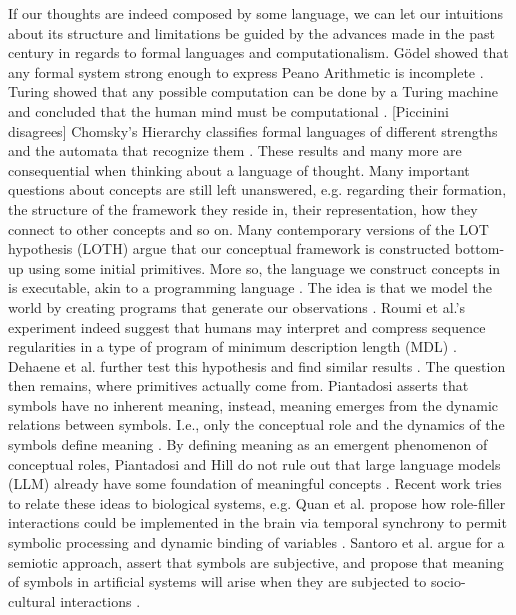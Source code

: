If our thoughts are indeed composed by some language, we can let our intuitions about its structure and limitations be guided by the advances made in the past century in regards to formal languages and computationalism.
Gödel showed that any formal system strong enough to express Peano Arithmetic is incomplete \cite{sep-goedel-incompleteness}. Turing showed that any possible computation can be done by a Turing machine and concluded that the human mind must be computational \cite{JCopeland2004-JCOTET}. [Piccinini disagrees]
Chomsky's Hierarchy classifies formal languages of different strengths and the automata that recognize them \cite{chomsky1959certain}.
These results and many more are consequential when thinking about a language of thought.
Many important questions about concepts are still left unanswered, e.g. regarding their formation, the structure of the framework they reside in, their representation, how they connect to other concepts and so on. 
Many contemporary versions of the LOT hypothesis (LOTH) argue that our conceptual framework is constructed bottom-up using some initial primitives. More so, the language we construct concepts in is executable, akin to a programming language \cite{dehaene_symbols_2022}. The idea is that we model the world by creating programs that generate our observations \cite{rule_child_2020}. 
Roumi et al.'s experiment indeed suggest that humans may interpret and compress sequence regularities in a type of program of minimum description length (MDL) \cite{al_roumi_mental_2021}.
Dehaene et al. further test this hypothesis and find similar results \cite{dehaene_symbols_2022}.
The question then remains, where primitives actually come from.
Piantadosi asserts that symbols have no inherent meaning, instead, meaning emerges from the dynamic relations between symbols. I.e., only the conceptual role and the dynamics of the symbols define meaning \cite{piantadosi2021computational}.
By defining meaning as an emergent phenomenon of conceptual roles, Piantadosi and Hill do not rule out that large language models (LLM) already have some foundation of meaningful concepts \cite{piantasodi2022meaning}.
Recent work tries to relate these ideas to biological systems, e.g. Quan et al. propose how role-filler interactions could be implemented in the brain via temporal synchrony to permit symbolic processing and dynamic binding of variables \cite{do2021neural}.
Santoro et al. argue for a semiotic approach, assert that symbols are subjective, and propose that meaning of symbols in artificial systems will arise when they are subjected to socio-cultural interactions \cite{santoro2021symbolic}.

